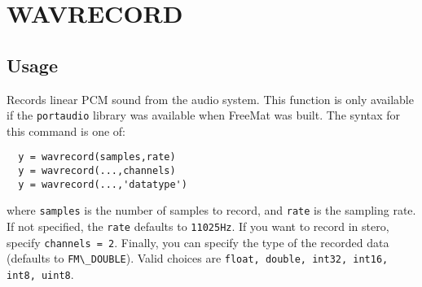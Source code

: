 \section{WAVRECORD}

\subsection{Usage}

Records linear PCM sound from the audio system.  This function is
only available if the \verb|portaudio| library was available when FreeMat
was built.  The syntax for this command is one of:
\begin{verbatim}
  y = wavrecord(samples,rate)
  y = wavrecord(...,channels)
  y = wavrecord(...,'datatype')
\end{verbatim}
where \verb|samples| is the number of samples to record, and \verb|rate| is the
sampling rate.  If not specified, the \verb|rate| defaults to \verb|11025Hz|.
If you want to record in stero, specify \verb|channels = 2|.  Finally, you
can specify the type of the recorded data (defaults to \verb|FM\_DOUBLE|).
Valid choices are \verb|float, double, int32, int16, int8, uint8|.
